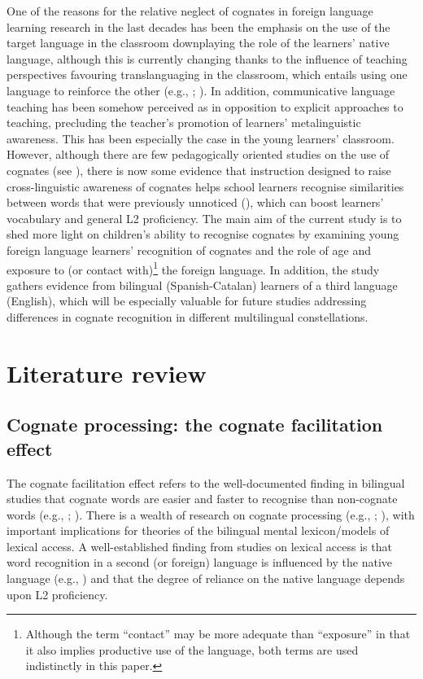 \documentclass[output=paper,modfonts,nonflat,newtxmath]{langsci/langscibook}
\begin{document}
 {One of the reasons for the relative neglect of cognates in foreign language learning research in the last decades has been the emphasis on the use of the target language in the classroom downplaying the role of the learners’ native language, although this is currently changing thanks to the influence of teaching perspectives favouring translanguaging in the classroom, which entails using one language to reinforce the other (e.g., \citealt{Williams2002}; \citealt{GarcíaLin2016}). In addition, communicative language teaching has been somehow perceived as in opposition to explicit approaches to teaching, precluding the teacher’s promotion of learners’ metalinguistic awareness. This has been especially the case in the young learners’ classroom. However, although there are few pedagogically oriented studies on the use of cognates (see \citealt{Otwinowska2016}), there is now some evidence that instruction designed to raise cross-linguistic awareness of cognates helps school learners recognise similarities between words that were previously unnoticed (\citealt{WhiteHorst2012}), which can boost learners’ vocabulary and general L2 proficiency. The main aim of the current study is to shed more light on children’s ability to recognise cognates by examining young foreign language learners’ recognition of cognates and the role of age and exposure to (or contact with)}\footnote{ {Although the term “contact” may be more adequate than “exposure” in that it also implies productive use of the language, both terms are used indistinctly in this paper.}} {the foreign language.}{ }{In addition, the study gathers evidence from bilingual (Spanish-Catalan) learners of a third language (English), which will be especially valuable for future studies addressing differences in cognate recognition in different multilingual constellations.}

\section{Literature review}


\subsection{Cognate processing: the cognate facilitation effect}

{The cognate facilitation effect refers to the well-documented finding in bilingual studies that cognate words are easier and faster to recognise than non-cognate words (e.g., \citealt{CaramazzaBrones1979}; \citealt{CostaEtAl2000}). There is a wealth of research on cognate processing (e.g., \citealt{VanHelldeGroot1998}; \citealt{DijkstraEtAl1999}), with important implications for theories of the bilingual mental lexicon/models of lexical access. A well-established finding from studies on lexical access is that word recognition in a second (or foreign) language is influenced by the native language (e.g., \citealt{KrollDijkstra2002}) and that the degree of reliance on the native language depends upon L2 proficiency.}
\end{document}
